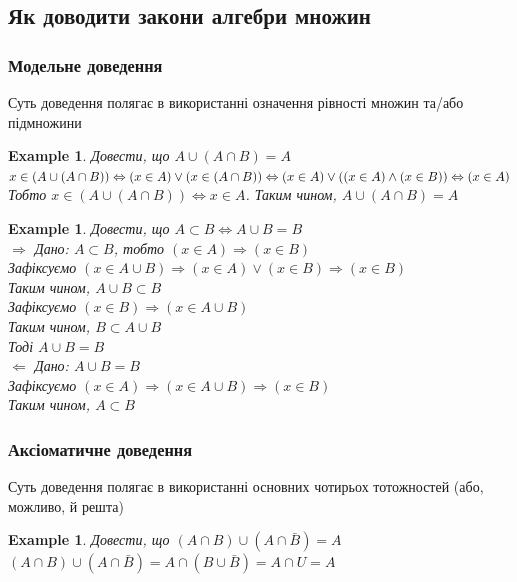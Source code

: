 \documentclass[a4paper, 14pt]{extarticle}
\def\rightproof{$\boxed{\Rightarrow}$ }
\def\leftproof{$\boxed{\Leftarrow}$ }
\theoremstyle{theoremdd}
\theoremstyle{theoremdd}
\theoremstyle{theoremdd}
\theoremstyle{theoremdd}
\newtheorem{example}[theorem]{Example}
\theoremstyle{theoremdd}
\theoremstyle{theoremdd}
\theoremstyle{theoremdd}
\theoremstyle{theoremdd}
\begin{document}
\subsection{Як доводити закони алгебри множин}
\subsubsection{Модельне доведення}
Суть доведення полягає в використанні означення рівності множин та/або підмножини
\begin{example}
Довести, що $A \cup (A \cap B) = A$\\
$x \in (A \cup (A \cap B)) \Leftrightarrow (x \in A) \vee (x \in (A \cap B)) \Leftrightarrow (x \in A) \vee ((x \in A) \wedge (x \in B)) \\ \Leftrightarrow (x \in A)$\\
Тобто $x \in (A \cup (A \cap B)) \Leftrightarrow x \in A$. Таким чином, $A \cup (A \cap B) = A$
\end{example}

\begin{example}
Довести, що $A \subset B \iff A \cup B = B$\\
\rightproof Дано: $A \subset B$, тобто $(x \in A) \Rightarrow (x \in B)$\\
Зафіксуємо $(x \in A \cup B) \Rightarrow (x \in A) \vee (x \in B) \Rightarrow (x \in B)$\\
Таким чином, $A \cup B \subset B$\\
Зафіксуємо $(x \in B) \Rightarrow (x \in A \cup B)$\\
Таким чином, $B \subset A \cup B$\\
Тоді $A \cup B = B$
\bigskip \\
\leftproof Дано: $A \cup B = B$\\
Зафіксуємо $(x \in A) \Rightarrow (x \in A \cup B) \Rightarrow (x \in B)$\\
Таким чином, $A \subset B$
\end{example}

\subsubsection{Аксіоматичне доведення}
Суть доведення полягає в використанні основних чотирьох тотожностей (або, можливо, й решта)
\begin{example}
Довести, що $(A \cap B) \cup (A \cap \bar{B}) = A$\\
$(A \cap B) \cup (A \cap \bar{B}) = A \cap (B \cup \bar{B}) = A \cap U = A$
\end{example}
\end{document}
